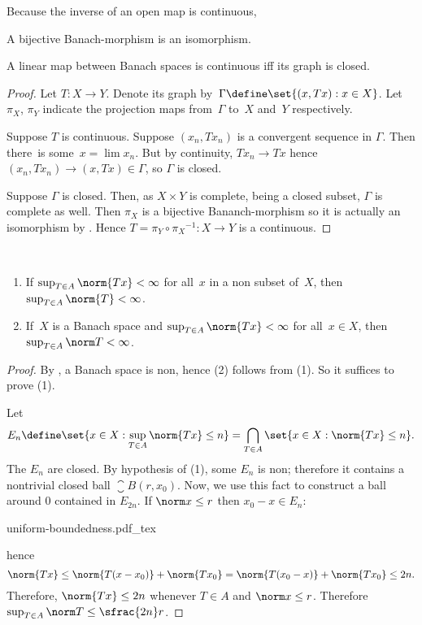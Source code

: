 \documentclass{scrartcl}
\newcommand{\ball}{B}
\begin{document}
Because the inverse of an open map is continuous,
\begin{cor}\label{bounded inverse}
  A bijective Banach-morphism is an isomorphism. \cite[pg.\ 162]{folland}
\end{cor}
\begin{theorem}
  A linear map between Banach spaces is continuous iff its graph is closed. \cite[pg.\ 163]{folland}
\end{theorem}
\begin{proof}
  \newcommand{\graph}{\Gamma}
  Let \(T:X \to Y\). Denote its graph by~\(\graph\define\set{(x,Tx):x\in X}\).
  Let~\(\pi_X\), \(\pi_Y\) indicate the projection maps from~\(\graph\) to~\(X\) and~\(Y\) respectively.

  Suppose \(T\) is continuous. Suppose \((x_n,Tx_n)\) is a convergent sequence in \(\graph\). Then there~is some~\(x=\lim x_n\). But by continuity, \(Tx_n\to Tx\) hence \((x_n,Tx_n)\to (x,Tx)\in\graph\), so \(\graph\) is closed.

  Suppose \(\graph\) is closed. Then, as \(X\times Y\) is complete, being a closed subset, \(\graph\) is complete as well.
  Then \(\pi_X\) is a bijective Bananch-morphism so it is actually an isomorphism by . Hence
  \(T=\pi_Y\circ {\pi_X}^{-1}: X\to Y\) is a continuous.
\end{proof}
\begin{theorem}\label{uniform bdd} \
  \begin{enumerate}
  \item If\/ \(\sup_{T\in A} \norm{Tx} < \infty\) for all\euleritcorrect\ \(x\) in a non
    subset of\euleritcorrect\ \(X\), then\/ \(\sup_{T\in A}\norm{T}<\infty\).
  \item If\euleritcorrect\ \(X\) is a Banach space and\/ \(\sup_{T\in A}\norm{Tx}< \infty\) for all\euleritcorrect\ \(x\in X\), then\/ \(\sup_{T\in A}\norm T < \infty\). \cite[pg.\ 163]{folland}
  \end{enumerate}
\end{theorem}
\begin{proof}
  By , a Banach space is non, hence (2) follows from (1). So it suffices to prove (1).

  Let
  \[
    E_n\define \set{x\in X : \sup_{T\in A}\norm{Tx} \leq n} = \bigcap_{T\in A} \set{x\in X: \norm{Tx} \leq n}.
  \]
  The \(E_n\) are closed. By hypothesis of (1), some \(E_n\) is non; therefore it contains a nontrivial closed ball \(\closure{\ball(r,x_0)}\). Now, we use this fact to construct a ball around \(0\) contained in \(E_{2n}\). If \(\norm x \leq r\) then \(x_0-x\in E_n\):
  \begin{center}
    {uniform-boundedness.pdf_tex}
  \end{center}
  hence
  \[
    \norm{Tx} \leq \norm{T(x-x_0)}+\norm{Tx_0} = \norm{T(x_0-x)}+\norm{Tx_0} \leq 2n.
  \]
  Therefore, \(\norm{Tx}\leq 2n\) whenever \(T\in A\) and \(\norm x \leq r\). Therefore \(\sup_{T\in A}\norm T \leq \sfrac {2n} r\).
\end{proof}
\printbibliography
\end{document}
